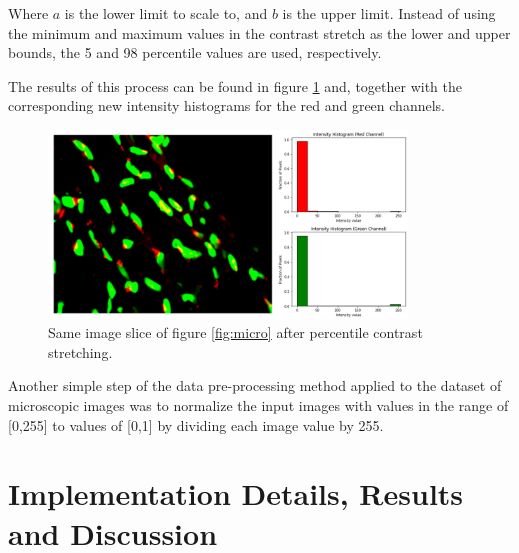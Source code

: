 
Where $a$ is the lower limit to scale to, and $b$ is the upper limit. Instead of using the minimum and maximum values in the contrast stretch as the lower and upper bounds, the 5 and 98 percentile values are used, respectively. 

The results of this process can be found in figure \ref{fig:micro_pre} and, together with the corresponding new intensity histograms for the red and green channels.

\begin{figure}[!htb]
  \centering
  \includegraphics[width=0.85\textwidth]{Images/pre.jpg}
  \caption[Same image slice of figure \ref{fig:micro} after percentile contrast stretching.]{Same image slice of figure \ref{fig:micro} after percentile contrast stretching.}
  \label{fig:micro_pre}
\end{figure}


Another simple step of the data pre-processing method applied to the dataset of microscopic images was to normalize the input images with values in the range of [0,255] to values of [0,1] by dividing each image value by 255.


\section{Implementation Details, Results and Discussion}

